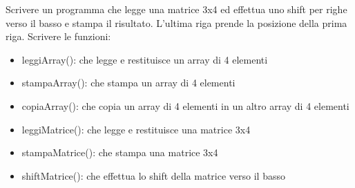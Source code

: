 \begin{Exercise}[label={ex:shift}]
    Scrivere un programma che legge una matrice 3x4 ed effettua uno shift per righe verso il basso e stampa il risultato. L’ultima riga prende la posizione della prima riga.
    Scrivere le funzioni:   
    \begin{itemize}
        \item leggiArray(): che legge e restituisce un array di 4 elementi
        \item stampaArray(): che stampa un array di 4 elementi
        \item copiaArray(): che copia un array di 4 elementi in un altro array di 4 elementi
        \item leggiMatrice(): che legge e restituisce una matrice 3x4
        \item stampaMatrice(): che stampa una matrice 3x4
        \item shiftMatrice(): che effettua lo shift della matrice verso il basso
    \end{itemize}
\end{Exercise}

\begin{Answer}[ref={ex:shift}]
  	
\end{Answer}